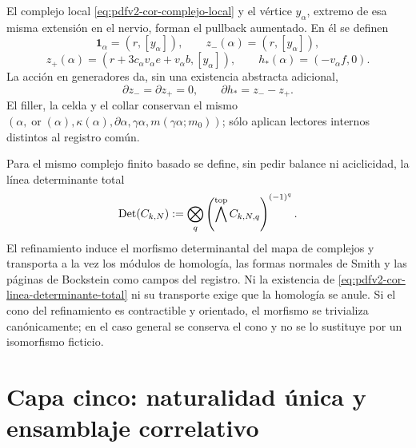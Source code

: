 El complejo local \eqref{eq:pdfv2-cor-complejo-local} y el vértice
\(y_\alpha\), extremo de esa misma extensión en el nervio, forman el pullback
aumentado. En él se definen
\begin{equation}
\label{eq:pdfv2-cor-zpm-h}
 \mathbf1_\alpha=(r,[y_\alpha]),\qquad
 z_-(\alpha)=(r,[y_\alpha]),
\end{equation}
\begin{equation}
\label{eq:pdfv2-cor-zplus-h}
 z_+(\alpha)=
 (r+3c_\alpha v_\alpha e+v_\alpha b,[y_\alpha]),
 \qquad
 h_*(\alpha)=(-v_\alpha f,0).
\end{equation}
La acción en generadores da, sin una existencia abstracta adicional,
\begin{equation}
\label{eq:pdfv2-cor-filler}
 \partial z_-=\partial z_+=0,\qquad
 \partial h_*=z_--z_+.
\end{equation}
El filler, la celda y el collar conservan el mismo
\((\alpha,\operatorname{or}(\alpha),\kappa(\alpha),\partial\alpha,
\gamma\alpha,m(\gamma\alpha;m_0))\); sólo aplican lectores internos distintos
al registro común.

Para el mismo complejo finito basado se define, sin pedir balance ni
aciclicidad, la línea determinante total
\begin{equation}
\label{eq:pdfv2-cor-linea-determinante-total}
 \operatorname{Det}(C_{k,N}):=
 \bigotimes_q
 \left(\bigwedge^{\rm top}C_{k,N,q}\right)^{(-1)^q}.
\end{equation}
El refinamiento induce el morfismo determinantal del mapa de complejos y
transporta a la vez los módulos de homología, las formas normales de Smith y
las páginas de Bockstein como campos del registro. Ni la existencia de
\eqref{eq:pdfv2-cor-linea-determinante-total} ni su transporte exige que la
homología se anule. Si el cono del refinamiento es contractible y orientado,
el morfismo se trivializa canónicamente; en el caso general se conserva el
cono y no se lo sustituye por un isomorfismo ficticio.

\section{Capa cinco: naturalidad única y ensamblaje correlativo}

